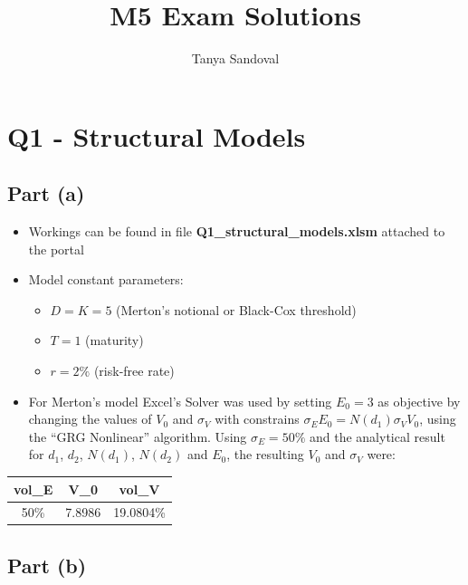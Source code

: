 \documentclass{article}
\title{M5 Exam Solutions}
\author{Tanya Sandoval}
\providecommand{\tightlist}{%
      \setlength{\itemsep}{0pt}\setlength{\parskip}{0pt}}
\begin{document}
    
    
    \maketitle
    
    

    

    \section{Q1 - Structural Models}\label{q1---structural-models}

    \subsection{Part (a)}\label{part-a}

\begin{itemize}
\item
  Workings can be found in file \textbf{Q1\_structural\_models.xlsm}
  attached to the portal
\item
  Model constant parameters:

  \begin{itemize}
  \tightlist
  \item
    \(D = K = 5\) (Merton's notional or Black-Cox threshold)
  \item
    \(T = 1\) (maturity)
  \item
    \(r = 2\%\) (risk-free rate)
  \end{itemize}
\item
  For Merton's model Excel's Solver was used by setting \(E_0 = 3\) as
  objective by changing the values of \(V_0\) and \(\sigma_V\)
  with constrains \(\sigma_E E_0 = N(d_1) \sigma_V V_0\), using the
  ``GRG Nonlinear'' algorithm. Using 
  \(\sigma_E = 50 \%\) and the analytical result for \(d_1\),
  \(d_2\), \(N(d_1)\), \(N(d_2)\) and \(E_0\), the resulting $V_0$ and $\sigma_V$ were:
\end{itemize}

\begin{longtable}[c]{@{}ccc@{}}
\toprule
vol\_E & V\_0 & vol\_V\tabularnewline
\midrule
\endhead
50\% & 7.8986 & 19.0804\%\tabularnewline
\bottomrule
\end{longtable}

    \subsection{Part (b)}\label{part-b}
\end{document}
